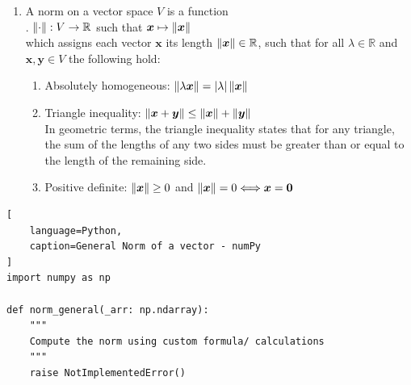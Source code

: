 \begin{enumerate}
    \item 
    \begin{definition}[Norm]
        A norm on a vector space $V$ is a function
        \hfill \cite{mfml/book/mml/Deisenroth-Faisal-Ong}
        \\
        .\hfill
        $\left\| \cdot \right\|: V \to \mathbb{R}$ such that $\bm{x} \mapsto \left\| \bm{x} \right\|$
        \hfill \cite{mfml/book/mml/Deisenroth-Faisal-Ong}
        \\
        which assigns each vector $\bm{x}$ its length $\left\| \bm{x} \right\| \in \mathbb{R}$, such that for all $\lambda \in \mathbb{R}$ and $\bm{x}, \bm{y} \in V$ the following hold:
        \hfill \cite{mfml/book/mml/Deisenroth-Faisal-Ong}
    \end{definition}
    \begin{enumerate}
        \item Absolutely homogeneous: $\left\| \lambda \bm{x} \right\| = \left| \lambda \right| \left\| \bm{x} \right\|$
        \hfill \cite{mfml/book/mml/Deisenroth-Faisal-Ong}

        \item Triangle inequality: $\left\| \bm{x} + \bm{y} \right\| \leq \left\| \bm{x} \right\| + \left\| \bm{y} \right\|$
        \hfill \cite{mfml/book/mml/Deisenroth-Faisal-Ong}
        \\
        In geometric terms, the triangle inequality states that for any triangle, the sum of the lengths of any two sides must be greater than or equal to the length of the remaining side.
        \hfill \cite{mfml/book/mml/Deisenroth-Faisal-Ong}

        \item Positive definite: $\left\| \bm{x} \right\| \geq 0$ and $\left\| \bm{x} \right\| = 0 \Longleftrightarrow \bm{x} = \bm{0}$
        \hfill \cite{mfml/book/mml/Deisenroth-Faisal-Ong}
    \end{enumerate}
\end{enumerate}




\begin{lstlisting}[
    language=Python,
    caption=General Norm of a vector - numPy
]
import numpy as np

def norm_general(_arr: np.ndarray):
    """
    Compute the norm using custom formula/ calculations
    """
    raise NotImplementedError()
\end{lstlisting}







